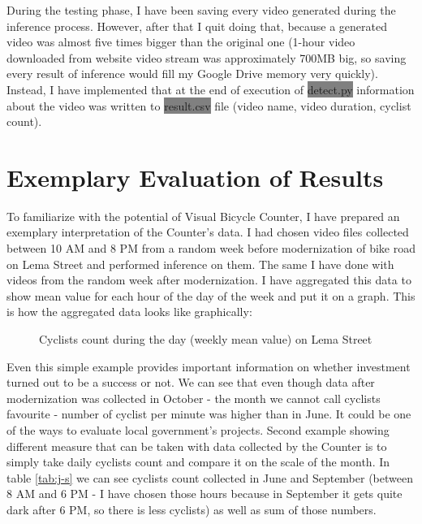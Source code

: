 During the testing phase, I have been saving every video generated during the inference process. However, after that I quit doing that, because a generated video was almost five times bigger than the original one (1-hour video downloaded from website video stream was approximately 700MB big, so saving every result of inference would fill my Google Drive memory very quickly). Instead, I have implemented that at the end of execution of \colorbox{Gray}{detect.py} information about the video was written to \colorbox{Gray}{result.csv} file (video name, video duration, cyclist count).
\section{Exemplary Evaluation of Results}
\label{sec:results}
To familiarize with the potential of Visual Bicycle Counter, I have prepared an exemplary interpretation of the Counter's data. I had chosen video files collected between 10 AM and 8 PM from a random week before modernization of bike road on Lema Street and performed inference on them. The same I have done with videos from the random week after modernization. I have aggregated this data to show mean value for each hour of the day of the week and put it on a graph. This is how the aggregated data looks like graphically:
\begin{figure}[h]
    \centering
    \caption{Cyclists count during the day (weekly mean value) on Lema Street}
    \label{fig:graph}
\end{figure}
\newline Even this simple example provides important information on whether investment turned out to be a success or not. We can see that even though data after modernization was collected in October - the month we cannot call cyclists favourite - number of cyclist per minute was higher than in June. It could be one of the ways to evaluate local government's projects. Second example showing different measure that can be taken with data collected by the Counter is to simply take daily cyclists count and compare it on the scale of the month. In table \ref{tab:j-s} we can see cyclists count collected in June and September (between 8 AM and 6 PM - I have chosen those hours because in September it gets quite dark after 6 PM, so there is less cyclists) as well as sum of those numbers.

